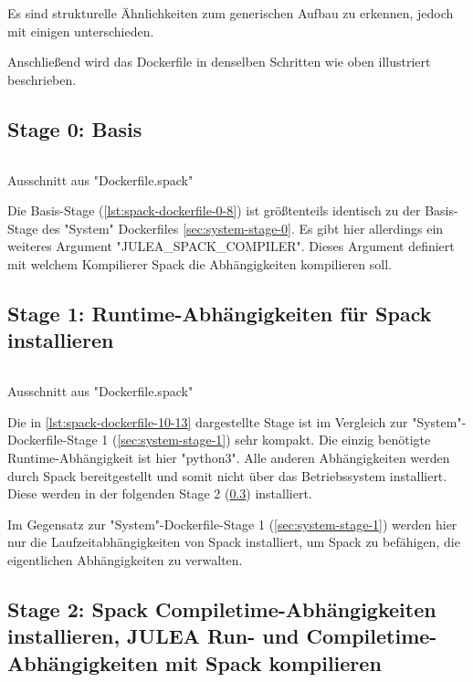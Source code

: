 Es sind strukturelle Ähnlichkeiten zum generischen Aufbau zu erkennen, jedoch mit einigen unterschieden. 

Anschließend wird das Dockerfile in denselben Schritten wie oben illustriert beschrieben.

\subsection{Stage 0: Basis}

\begin{listing}[H]
    \inputminted[firstline=0,lastline=8]{dockerfile}{./code-examples/Dockerfile.spack}
    \caption{Ausschnitt aus "Dockerfile.spack"}
    \label{lst:spack-dockerfile-0-8}
\end{listing}

Die Basis-Stage (\cref{lst:spack-dockerfile-0-8}) ist größtenteils identisch zu der Basis-Stage des "System" Dockerfiles \cref{sec:system-stage-0}. Es gibt hier allerdings ein weiteres Argument "JULEA\_SPACK\_COMPILER". Dieses Argument definiert mit welchem Kompilierer Spack die Abhängigkeiten kompilieren soll. 

\subsection{Stage 1: Runtime-Abhängigkeiten für Spack installieren}

\begin{listing}[H]
    \inputminted[firstline=10,lastline=13]{dockerfile}{./code-examples/Dockerfile.spack}
    \caption{Ausschnitt aus "Dockerfile.spack"}
    \label{lst:spack-dockerfile-10-13}
\end{listing}

Die in \cref{lst:spack-dockerfile-10-13} dargestellte Stage ist im Vergleich zur "System"-Dockerfile-Stage 1 (\cref{sec:system-stage-1}) sehr kompakt.
Die einzig benötigte Runtime-Abhängigkeit ist hier "python3". Alle anderen Abhängigkeiten werden durch Spack bereitgestellt und somit nicht über das Betriebssystem installiert. Diese werden in der folgenden Stage 2 (\cref{sec:spack-stage-2}) installiert.  

Im Gegensatz zur "System"-Dockerfile-Stage 1 (\cref{sec:system-stage-1}) werden hier nur die Laufzeitabhängigkeiten von Spack installiert, um Spack zu befähigen, die eigentlichen Abhängigkeiten zu verwalten.


\subsection{Stage 2: Spack Compiletime-Abhängigkeiten installieren, JULEA Run- und Compiletime-Abhängigkeiten mit Spack kompilieren} \label{sec:spack-stage-2}

